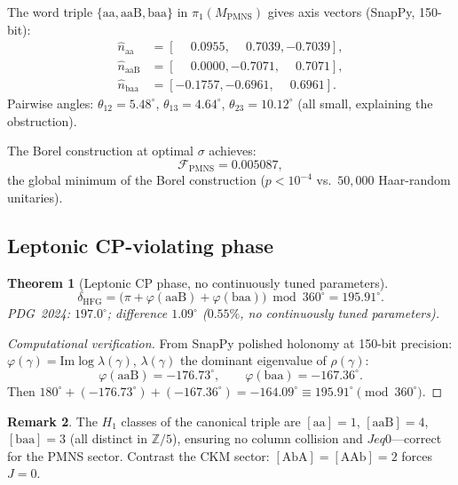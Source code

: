 \documentclass[11pt,a4paper]{article}
\newtheorem{theorem}{Theorem}
\theoremstyle{definition}
\newtheorem{remark}[theorem]{Remark}
\newcommand{\MPMNS}{M_{\mathrm{PMNS}}}
\newcommand{\Zfive}{\mathbb{Z}/5}
\begin{document}
The word triple $\{\mathrm{aa},\mathrm{aaB},\mathrm{baa}\}$
in $\pi_1(\MPMNS)$ gives axis vectors (SnapPy, 150-bit):
\begin{align*}
  \hat{n}_{\mathrm{aa}}  &= [\phantom{-}0.0955,\phantom{-}0.7039,-0.7039],\\
  \hat{n}_{\mathrm{aaB}} &= [\phantom{-}0.0000,-0.7071,\phantom{-}0.7071],\\
  \hat{n}_{\mathrm{baa}} &= [-0.1757,-0.6961,\phantom{-}0.6961].
\end{align*}
Pairwise angles: $\theta_{12}=5.48^\circ$, $\theta_{13}=4.64^\circ$,
$\theta_{23}=10.12^\circ$ (all small, explaining the obstruction).

The Borel construction at optimal $\sigma$ achieves:
\[
  \mathcal{F}_{\mathrm{PMNS}} = 0.005087,
\]
the global minimum of the Borel construction
($p<10^{-4}$ vs.\ $50{,}000$ Haar-random unitaries).

\subsection{Leptonic CP-violating phase}
\label{subsec:cp}

\begin{theorem}[Leptonic CP phase, no continuously tuned parameters]
\label{thm:cp}
\[
  \boxed{
    \delta_{\mathrm{HFG}}
    = \bigl(\pi + \varphi(\mathrm{aaB}) + \varphi(\mathrm{baa})\bigr)
      \bmod 360^\circ
    = 195.91^\circ.
  }
\]
PDG~2024: $197.0^\circ$; difference $1.09^\circ$ ($0.55\%$,
no continuously tuned parameters).
\end{theorem}

\begin{proof}[Computational verification]
From SnapPy polished holonomy at 150-bit precision:
$\varphi(\gamma)=\mathrm{Im}\log\lambda(\gamma)$,
$\lambda(\gamma)$ the dominant eigenvalue of $\rho(\gamma)$:
\[
  \varphi(\mathrm{aaB}) = -176.73^\circ,
  \qquad
  \varphi(\mathrm{baa}) = -167.36^\circ.
\]
Then $180^\circ + (-176.73^\circ) + (-167.36^\circ)
= -164.09^\circ \equiv 195.91^\circ \pmod{360^\circ}$.
\end{proof}

\begin{remark}
The $H_1$ classes of the canonical triple are
$[\mathrm{aa}]=1$, $[\mathrm{aaB}]=4$, $[\mathrm{baa}]=3$
(all distinct in $\Zfive$), ensuring no column collision
and $J
eq0$---correct for the PMNS sector.
Contrast the CKM sector: $[\mathrm{AbA}]=[\mathrm{AAb}]=2$
forces $J=0$.
\end{remark}
\end{document}
